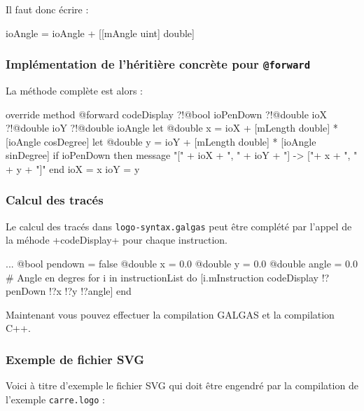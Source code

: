  Il faut donc écrire :
\begin{galgas}
ioAngle = ioAngle + [[mAngle uint] double]
\end{galgas}

\subsubsection{Implémentation de l'héritière concrète pour \texttt{@forward}}
La méthode complète est alors :

\begin{galgas}
override method @forward codeDisplay
  ?!@bool ioPenDown
  ?!@double ioX
  ?!@double ioY
  ?!@double ioAngle
{
  let @double x = ioX + [mLength double] * [ioAngle cosDegree]
  let @double y = ioY + [mLength double] * [ioAngle sinDegree]
  if ioPenDown then
    message "[" + ioX + ", " + ioY + "] -> ["+ x + ", " + y + "]\n"
  end
  ioX = x
  ioY = y
}
\end{galgas}

\subsubsection{Calcul des tracés}
Le calcul des tracés dans \texttt{logo-syntax.galgas} peut être complété par l'appel de la méhode \ggs+codeDisplay+ pour chaque instruction.
\begin{galgas}
  ...
  @bool pendown = false
  @double x = 0.0
  @double y = 0.0
  @double angle = 0.0 # Angle en degres
  for i in instructionList do
    [i.mInstruction codeDisplay !?penDown !?x !?y !?angle]
  end
\end{galgas}

Maintenant vous pouvez effectuer la compilation GALGAS et la compilation C++.

\subsubsection{Exemple de fichier SVG}
Voici à titre d'exemple le fichier SVG qui doit être engendré par la compilation de l'exemple \texttt{carre.logo} :


